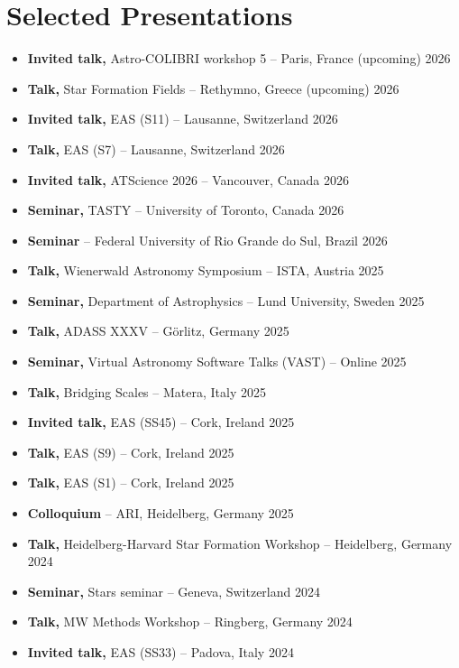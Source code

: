 \section*{Selected Presentations}

\begin{itemize}
    \item \textbf{Invited talk,} Astro-COLIBRI workshop 5 -- Paris, France \hfill (upcoming) 2026
    \item \textbf{Talk,} Star Formation Fields -- Rethymno, Greece \hfill (upcoming) 2026
    \item \textbf{Invited talk,} EAS (S11) -- Lausanne, Switzerland \hfill 2026
    \item \textbf{Talk,} EAS (S7) -- Lausanne, Switzerland \hfill 2026
    \item \textbf{Invited talk,} ATScience 2026 -- Vancouver, Canada \hfill 2026
    \item \textbf{Seminar,} TASTY -- University of Toronto, Canada \hfill 2026
    \item \textbf{Seminar} -- Federal University of Rio Grande do Sul, Brazil \hfill 2026
    \item \textbf{Talk,} Wienerwald Astronomy Symposium -- ISTA, Austria \hfill 2025
    \item \textbf{Seminar,} Department of Astrophysics -- Lund University, Sweden \hfill 2025
    \item \textbf{Talk,} ADASS XXXV -- Görlitz, Germany \hfill 2025
    \item \textbf{Seminar,} Virtual Astronomy Software Talks (VAST) -- Online \hfill 2025
    \item \textbf{Talk,} Bridging Scales -- Matera, Italy \hfill 2025
    \item \textbf{Invited talk,} EAS (SS45) -- Cork, Ireland \hfill 2025
    \item \textbf{Talk,} EAS (S9) -- Cork, Ireland \hfill 2025
    \item \textbf{Talk,} EAS (S1) -- Cork, Ireland \hfill 2025
    \item \textbf{Colloquium} -- ARI, Heidelberg, Germany \hfill 2025
    \item \textbf{Talk,} Heidelberg-Harvard Star Formation Workshop -- Heidelberg, Germany \hfill 2024
    \item \textbf{Seminar,} Stars seminar -- Geneva, Switzerland \hfill 2024
    \item \textbf{Talk,} MW Methods Workshop -- Ringberg, Germany \hfill 2024
    \item \textbf{Invited talk,} EAS (SS33) -- Padova, Italy \hfill 2024

\end{itemize}
